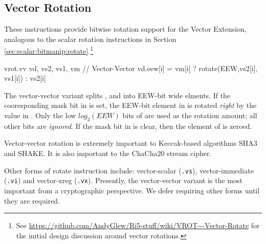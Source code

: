 
\subsection{Vector Rotation}

These instructions provide bitwise rotation support for the
Vector Extension, analogous to the scalar rotation instructions
in Section \ref{sec:scalar:bitmanip:rotate}.\footnote{
See \url{https://github.com/AndyGlew/Ri5-stuff/wiki/VROT---Vector-Rotate}
for the initial design discussion around vector rotations.
}

\begin{cryptoisa}
vrot.vv     vd, vs2, vs1, vm        // Vector-Vector
    vd.eew[i] = vm[i] ? rotate(EEW,vs2[i], vs1[i]) : vs2[i]
\end{cryptoisa}

The vector-vector variant splits \vrd,  and  into
EEW-bit wide elments.
If the cooresponding mask bit in \vm is set,
the EEW-bit element in  is rotated
{\em right} by the value in .
Only the low $log_2(EEW)$ bits of  are used as the rotation
amount; all other bits are {\em ignored}.
If the mask bit in \vm is clear, then the element of \vrd is zeroed.


Vector-vector rotation is extremely important to Keccak-based algorithms 
SHA3 and SHAKE.
It is also important to the ChaCha20 stream cipher.

Other forms of rotate instruction include:
vector-scalar (\texttt{.vs}),
vector-immediate (\texttt{.vi})
and
vector-xreg (\texttt{.vx}).
Presently, the vector-vector variant is the most important from a
cryptographic perspective.
We defer requiring other forms until they are required.
